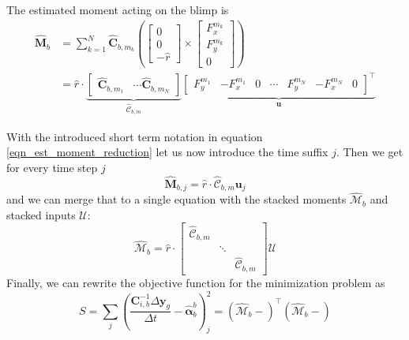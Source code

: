 The estimated moment acting on the blimp is
\begin{equation}
\label{eqn_est_moment_reduction}
\begin{aligned}
\hat{\mathbf{M}}_b &= \sum_{k=1}^N { \hat{\mathbf{C}}_{b,m_k} \left(
\left[ \begin{array}{c}
0 \\ 0 \\ - \hat{r}
\end{array} \right]
\times 
\left[ \begin{array}{c}
F^{m_k}_x \\ F^{m_k}_y \\ 0
\end{array} \right]
\right)} \\
&= \hat{r} \cdot \underbrace{ \left[
\begin{array}{ccc}
\hat{\mathbf{C}}_{b,m_1} & \cdots \hat{\mathbf{C}}_{b,m_N}
\end{array}
\right] }_{\hat{\mathcal{C}}_{b,m}}
\underbrace{ \left[
\begin{array}{ccccccc}
 F^{m_1}_y & - F^{m_1}_x & 0 & \cdots &F^{m_N}_y & -  F^{m_N}_x & 0 
\end{array}
\right]^\top }_{\mathbf{u}}
\end{aligned}
\end{equation}

With the introduced short term notation in equation \eqref{eqn_est_moment_reduction} let us now introduce the time suffix $j$. Then we get for every time step $j$
\begin{equation}
\hat{\mathbf{M}}_{b,j} = \hat{r} \cdot \hat{\mathcal{C}}_{b,m} \mathbf{u}_j
\end{equation}
and we can merge that to a single equation with the stacked moments $\hat{\mathcal{M}}_b$ and stacked inputs $\mathcal{U}$:
\begin{equation}
\hat{\mathcal{M}}_b = \hat{r}\cdot \left[ \begin{array}{ccc}
\hat{\mathcal{C}}_{b,m} & & \\ & \ddots & \\ & & \hat{\mathcal{C}}_{b,m}
\end{array} \right]
\mathcal{U}
\end{equation}
Finally, we can rewrite the objective function for the minimization problem as
\begin{equation}
S = \sum_j{ \left( \frac{\mathbf{C}_{i,b}^{-1} \Delta \mathbf{y}_g}{\Delta t} - \hat{\boldsymbol{\alpha}}_b^b \right)_j^2 }
= \left(\hat{\mathcal{M}}_b - \right)^\top 
  \left(\hat{\mathcal{M}}_b - \right)
\end{equation}

